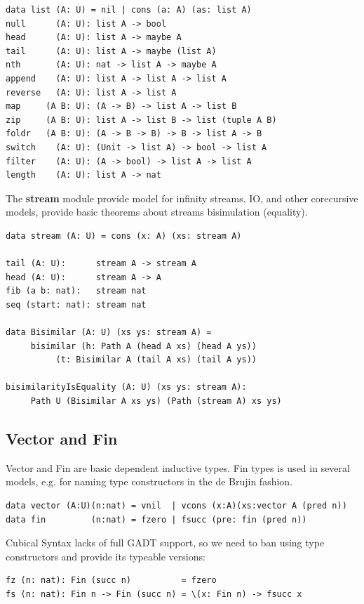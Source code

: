 \documentclass{article}
\begin{document}
\begin{lstlisting}[mathescape=true]
data list (A: U) = nil | cons (a: A) (as: list A)
null      (A: U): list A -> bool
head      (A: U): list A -> maybe A
tail      (A: U): list A -> maybe (list A)
nth       (A: U): nat -> list A -> maybe A
append    (A: U): list A -> list A -> list A
reverse   (A: U): list A -> list A
map     (A B: U): (A -> B) -> list A -> list B
zip     (A B: U): list A -> list B -> list (tuple A B)
foldr   (A B: U): (A -> B -> B) -> B -> list A -> B
switch    (A: U): (Unit -> list A) -> bool -> list A
filter    (A: U): (A -> bool) -> list A -> list A
length    (A: U): list A -> nat
\end{lstlisting}

The {\bf stream} module provide model for infinity streams, IO, and other corecursive models,
provide basic theorems about streams bisimulation (equality).

\begin{lstlisting}[mathescape=true]
data stream (A: U) = cons (x: A) (xs: stream A)

tail (A: U):      stream A -> stream A
head (A: U):      stream A -> A
fib (a b: nat):   stream nat
seq (start: nat): stream nat

data Bisimilar (A: U) (xs ys: stream A) =
     bisimilar (h: Path A (head A xs) (head A ys))
          (t: Bisimilar A (tail A xs) (tail A ys))

bisimilarityIsEquality (A: U) (xs ys: stream A):
     Path U (Bisimilar A xs ys) (Path (stream A) xs ys)
\end{lstlisting}

\subsection{Vector and Fin}

Vector and Fin are basic dependent inductive types. Fin types is used
in several models, e.g. for naming type constructors in the de Brujin fashion.

\begin{lstlisting}[mathescape=true]
data vector (A:U)(n:nat) = vnil  | vcons (x:A)(xs:vector A (pred n))
data fin         (n:nat) = fzero | fsucc (pre: fin (pred n))
\end{lstlisting}

Cubical Syntax lacks of full GADT support, so we need to ban using
type constructors and provide its typeable versions:

\begin{lstlisting}[mathescape=true]
fz (n: nat): Fin (succ n)          = fzero
fs (n: nat): Fin n -> Fin (succ n) = \(x: Fin n) -> fsucc x
\end{lstlisting}
\end{document}
